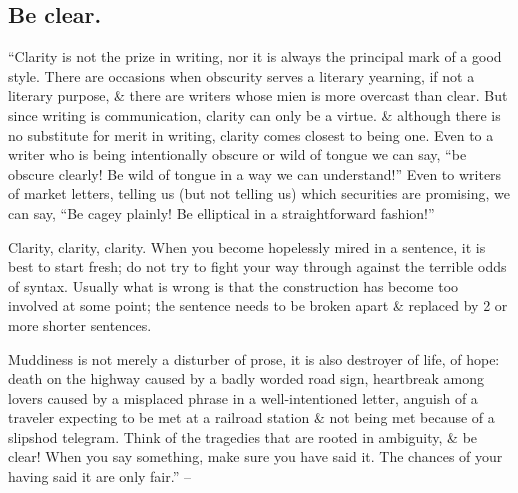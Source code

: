 \documentclass{article}
\numberwithin{equation}{section}
\begin{document}
\subsection{Be clear.}
``Clarity is not the prize in writing, nor it is always the principal mark of a good style. There are occasions when obscurity serves a literary yearning, if not a literary purpose, \& there are writers whose mien is more overcast than clear. But since writing is communication, clarity can only be a virtue. \& although there is no substitute for merit in writing, clarity comes closest to being one. Even to a writer who is being intentionally obscure or wild of tongue we can say, ``be obscure clearly! Be wild of tongue in a way we can understand!'' Even to writers of market letters, telling us (but not telling us) which securities are promising, we can say, ``Be cagey plainly! Be elliptical in a straightforward fashion!''

Clarity, clarity, clarity. When you become hopelessly mired in a sentence, it is best to start fresh; do not try to fight your way through against the terrible odds of syntax. Usually what is wrong is that the construction has become too involved at some point; the sentence needs to be broken apart \& replaced by 2 or more shorter sentences.

Muddiness is not merely a disturber of prose, it is also destroyer of life, of hope: death on the highway caused by a badly worded road sign, heartbreak among lovers caused by a misplaced phrase in a well-intentioned letter, anguish of a traveler expecting to be met at a railroad station \& not being met because of a slipshod telegram. Think of the tragedies that are rooted in ambiguity, \& be clear! When you say something, make sure you have said it. The chances of your having said it are only fair.'' -- \cite[p. 95]{Strunk_White2019}

\end{document}
